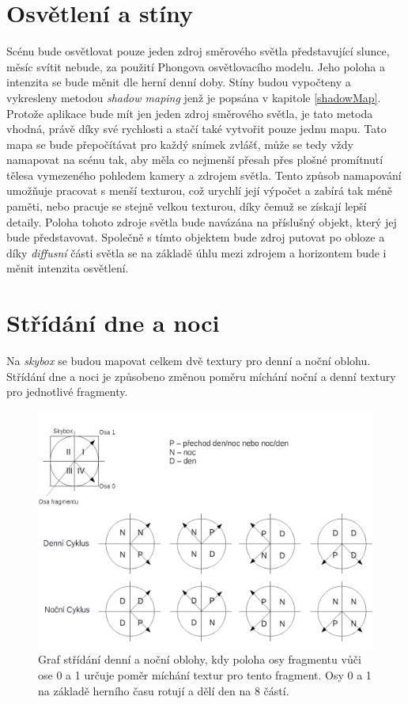 \section{Osvětlení a stíny}
Scénu bude osvětlovat pouze jeden zdroj směrového světla představující slunce, měsíc svítit nebude, za použití Phongova osvětlovacího modelu. Jeho poloha a intenzita se bude měnit dle herní denní doby.   
Stíny budou vypočteny a vykresleny metodou \emph{shadow maping }jenž je popsána v kapitole \ref{shadowMap}. Protože aplikace bude mít jen jeden  zdroj směrového světla, je tato metoda vhodná, právě díky své rychlosti a stačí také vytvořit pouze jednu mapu. Tato mapa se bude přepočítávat pro každý snímek zvlášť, může se tedy vždy namapovat na scénu tak, aby měla co nejmenší přesah přes plošné promítnutí tělesa vymezeného pohledem kamery a zdrojem světla. Tento způsob namapování umožňuje pracovat s menší texturou, což urychlí její výpočet a zabírá tak méně paměti, nebo pracuje se stejně velkou texturou, díky čemuž se získají lepší detaily. Poloha tohoto zdroje světla bude navázána na příslušný objekt, který jej bude představovat. Společně s tímto objektem bude zdroj putovat po obloze a díky \emph{diffusní} části světla se na základě úhlu mezi zdrojem a horizontem bude i měnit intenzita osvětlení. 
\section{Střídání dne a noci}\label{dayNight}
Na \emph{skybox} se budou mapovat celkem dvě textury pro denní a noční oblohu. Střídání dne a noci je způsobeno změnou poměru míchání noční a denní textury pro jednotlivé fragmenty.

    \begin{figure}
    	\begin{center}
    		\includegraphics[scale=0.35]{obrazky-figures/dayOnight}
    		\caption{Graf střídání denní a noční oblohy, kdy poloha osy fragmentu vůči ose 0 a 1 určuje poměr míchání textur pro tento fragment. Osy 0 a 1 na základě herního času rotují a dělí den na 8 částí. }\label{dayOnight}
    \end{center}\end{figure}

